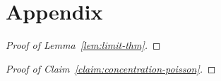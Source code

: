 \documentclass[letterpaper,11pt]{article}
\begin{document}
\begin{comment}
\section{{\color{red} Otras ideas a considerar:}}

\begin{itemize}
\item Podriamos definifir un operador que minimize la dispersión del bloque como,

\begin{equation}
\text{var}_C(\beta,\theta)=(1-\eta)(\beta-\theta(C))^2+ \frac{\eta}{\delta_c(C)} \sum_{w\in N_c(C)}(\beta-\theta(w))^2,
\end{equation}
donde $\theta(w)$ es la opinión de los miembros de $C$ según DeGroot.

	\item Seria interesante poder cuantificar cuanto gana una coordinacion versus no coordinarse, eso daria una especie de {\it price of coordination/collusion}.
	\item Ver los otros papers Acemoglu/experimentos para sacar mas ideas sobre que otra caracteristica/comportamiento podria ser interesante de medir o estudiar.
\end{itemize}
\end{comment}



\section{Appendix}

\begin{proof}[Proof of Lemma~\ref{lem:limit-thm}]

\end{proof}

\begin{proof}[Proof of Claim~\ref{claim:concentration-poisson}]

\end{proof}
\end{document}
